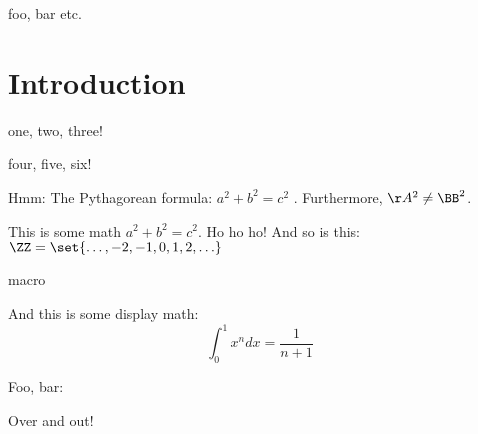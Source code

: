 
foo, bar
etc.



    
\newcommand{\DT}{{\mathbb S}}

\section{Introduction}

one, two, three!

four, five, six!

\begin{theorem}
Hmm: The Pythagorean formula: $a^2 + b^2 = c^2$
\yuuk {}.  Furthermore, $\AA^2 \ne \BB^2$.
\end{theorem}

This is some math $a^2 + b^2 = c^2$.  Ho ho ho!
And so is this: $\ZZ = \set{\ldots, -2, -1, 0, 1, 2, \ldots}$

macro 

And this is some display math: \[ \int_0^1 x^n dx = \frac{1}{n+1} \]

Foo, bar:

Over and out!


